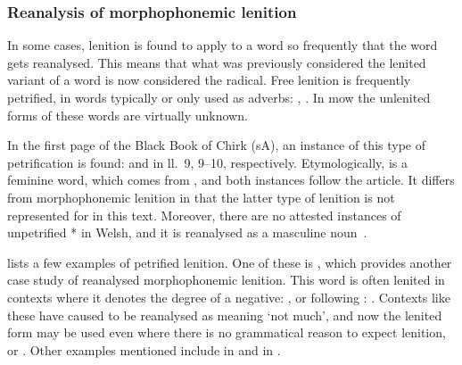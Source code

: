 \subsubsection{Reanalysis of morphophonemic lenition}
\label{sec:rean-morph-lenit}
In some cases, lenition is found to apply to a word so frequently that the word gets reanalysed. 
This means that what was previously considered the lenited variant of a word is now considered the radical. 
Free lenition is frequently petrified, \eg in words typically or only used as adverbs: , . In \gls{mow} the unlenited forms of these words are virtually unknown.



In the first page of the Black Book of Chirk (\gls{sA}), an instance of this type of petrification is found:  and  in ll.~9, 9--10, respectively. 
Etymologically,  is a feminine word, which comes from , and both instances follow the article. 
It differs from morphophonemic lenition in that the latter type of lenition is not represented for  in this text. 
Moreover, there are no attested instances of unpetrified * in Welsh, and it is reanalysed as a masculine noun~\autocite[Grawys, Garawys]{bevan_geiriadur_2014}. 

\Textcite[448-451]{morgan_y_1952} lists a few examples of petrified lenition. One of these is , which provides another case study of reanalysed morphophonemic lenition. This word is often lenited in contexts where it denotes the degree of a negative: \eg {}, or following \oes: . Contexts like these have caused  to be reanalysed as meaning `not much', and now the lenited form may be used even where there is no grammatical reason to expect lenition, \eg {} or . Other examples mentioned include  in  and  in .

